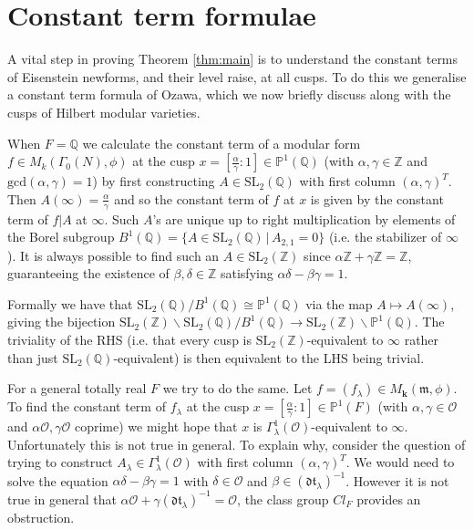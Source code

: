\documentclass[a4paper,oneside]{amsart}
\theoremstyle{plain}
\theoremstyle{definition}
\begin{document}
\section{Constant term formulae} \label{sec:constantterm}

A vital step in proving Theorem \ref{thm:main} is to understand the constant terms of Eisenstein newforms, and their level raise, at all cusps. To do this we generalise a constant term formula of Ozawa, which we now briefly discuss along with the cusps of Hilbert modular varieties.

When $F=\mathbb{Q}$ we calculate the constant term of a modular form $f\in M_k(\Gamma_0(N),\phi)$ at the cusp $x = [\frac{\alpha}{\gamma}:1]\in\mathbb{P}^1(\mathbb{Q})$ (with $\alpha,\gamma\in\mathbb{Z}$ and $\text{gcd}(\alpha,\gamma) = 1$) by first constructing $A \in\text{SL}_2(\mathbb{Q})$ with first column $(\alpha,\gamma)^T$. Then $A(\infty) = \frac{\alpha}{\gamma}$ and so the constant term of $f$ at $x$ is given by the constant term of $f|A$ at $\infty$. Such $A$'s are unique up to right multiplication by elements of the Borel subgroup $B^1(\mathbb{Q}) = \{A\in\text{SL}_2(\mathbb{Q})\,|\, A_{2,1} = 0\}$ (i.e. the stabilizer of $\infty$). It is always possible to find such an $A\in\text{SL}_2(\mathbb{Z})$ since $\alpha\mathbb{Z}+\gamma\mathbb{Z} = \mathbb{Z}$, guaranteeing the existence of $\beta,\delta\in\mathbb{Z}$ satisfying $\alpha\delta-\beta\gamma=1$. 

Formally we have that $\text{SL}_2(\mathbb{Q})/B^1(\mathbb{Q}) \cong \mathbb{P}^1(\mathbb{Q})$ via the map $A \mapsto A(\infty)$, giving the bijection $\text{SL}_2(\mathbb{Z})\backslash\text{SL}_2(\mathbb{Q})/B^1(\mathbb{Q}) \rightarrow \text{SL}_2(\mathbb{Z})\backslash\mathbb{P}^1(\mathbb{Q})$. The triviality of the RHS (i.e. that every cusp is $\text{SL}_2(\mathbb{Z})$-equivalent to $\infty$ rather than just $\text{SL}_2(\mathbb{Q})$-equivalent) is then equivalent to the LHS being trivial.

For a general totally real $F$ we try to do the same. Let $f = (f_{\lambda})\in M_{\textbf{k}}(\mathfrak{m},\phi)$. To find the constant term of $f_{\lambda}$ at the cusp $x = [\frac{\alpha}{\gamma}:1]\in\mathbb{P}^1(F)$ (with $\alpha,\gamma\in\mathcal{O}$ and $\alpha\mathcal{O},\gamma\mathcal{O}$ coprime) we might hope that $x$ is $\Gamma_{\lambda}^1(\mathcal{O})$-equivalent to $\infty$. Unfortunately this is not true in general. To explain why, consider the question of trying to construct $A_{\lambda} \in\Gamma_{\lambda}^1(\mathcal{O})$ with first column $(\alpha,\gamma)^T$. We would need to solve the equation $\alpha\delta - \beta\gamma = 1$ with $\delta\in\mathcal{O}$ and $\beta\in(\mathfrak{dt}_{\lambda})^{-1}$. However it is not true in general that $\alpha\mathcal{O} + \gamma(\mathfrak{dt}_{\lambda})^{-1} = \mathcal{O}$, the class group $Cl_F$ provides an obstruction.
\end{document}
